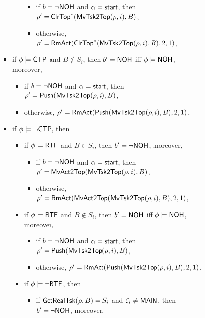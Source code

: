 \begin{itemize}
\begin{itemize}
\begin{itemize}
\begin{itemize}
\begin{itemize}
\begin{itemize}
							\begin{itemize}
								\item if $b = \neg {\sf NOH}$ and $\alpha = {\mathsf{start} }$, then $\rho'=\mathsf{ClrTop}^*(\mathsf{MvTsk2Top}(\rho, i), B)$,
								\item otherwise, $\rho' = \mathsf{RmAct}(\mathsf{ClrTop}^*(\mathsf{MvTsk2Top}(\rho, i), B), 2, 1)$, 
							\end{itemize}
						\end{itemize}
						\item if $\phi \models{\sf CTP}$ and $B \notin S_i$, then $b' = {\sf NOH}$ iff $\phi \models {\sf NOH}$, moreover, 
						\begin{itemize}
							\item if $b = \neg {\sf NOH}$ and $\alpha = {\mathsf{start} }$, then $\rho'=\mathsf{Push}(\mathsf{MvTsk2Top}(\rho, i), B)$,
							\item otherwise, $\rho' = \mathsf{RmAct}(\mathsf{Push}(\mathsf{MvTsk2Top}(\rho, i), B), 2, 1)$, 
						\end{itemize}
						\item if $\phi \models\neg{\sf CTP}$, then
						\begin{itemize}
							\item if $\phi \models {\sf RTF}$ and $B\in S_i$, then $b' = \neg {\sf NOH}$, moreover,
							\begin{itemize}
								\item if $b = \neg {\sf NOH}$ and $\alpha = {\mathsf{start} }$, then $\rho'=\mathsf{MvAct2Top}(\mathsf{MvTsk2Top}(\rho, i), B)$,
								\item otherwise, $\rho' = \mathsf{RmAct}(\mathsf{MvAct2Top}(\mathsf{MvTsk2Top}(\rho, i), B), 2, 1)$, 
							\end{itemize}
							\item if $\phi \models {\sf RTF}$ and $B\notin S_i$, then $b' = {\sf NOH}$ iff $\phi \models {\sf NOH}$, moreover, 
							\begin{itemize}
								\item if $b = \neg {\sf NOH}$ and $\alpha = {\mathsf{start} }$, then $\rho'=\mathsf{Push}(\mathsf{MvTsk2Top}(\rho, i), B)$,
								\item otherwise, $\rho' = \mathsf{RmAct}(\mathsf{Push}(\mathsf{MvTsk2Top}(\rho, i), B), 2, 1)$, 
							\end{itemize}
							\item if $\phi \models \neg {\sf RTF}$, then
							\begin{itemize}
								\item if $\mathsf{GetRealTsk}(\rho,B) = S_i$ and $\zeta_i \neq {\sf MAIN}$, then $b' = \neg {\sf NOH}$, moreover,
								\begin{itemize}

\end{itemize}
\end{itemize}
\end{itemize}
\end{itemize}
\end{itemize}
\end{itemize}
\end{itemize}
\end{itemize}
